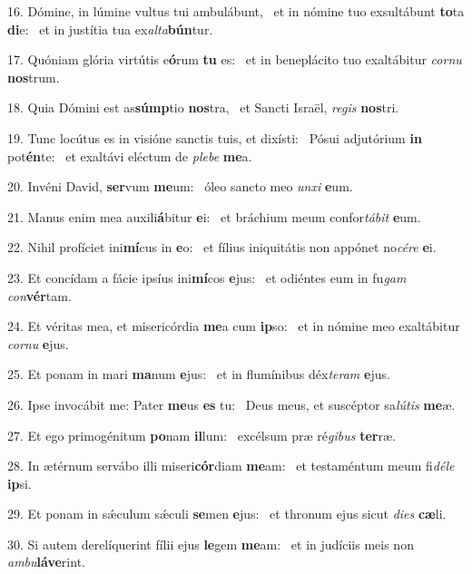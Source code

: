 16. Dómine, in lúmine vultus tui ambulábunt, \dag\  et in nómine tuo exsultábunt \textbf{to}ta \textbf{di}e: \ast\  et in justítia tua ex\textit{al}\textit{ta}\textbf{bún}tur.\

17. Quóniam glória virtútis e\textbf{ó}rum \textbf{tu} es: \ast\  et in beneplácito tuo exaltábitur \textit{cor}\textit{nu} \textbf{nos}trum.\

18. Quia Dómini est as\textbf{súmp}tio \textbf{nos}tra, \ast\  et Sancti Israël, \textit{re}\textit{gis} \textbf{nos}tri.\

19. Tunc locútus es in visióne sanctis tuis, et dixísti: \dag\  Pósui adjutórium \textbf{in} pot\textbf{én}te: \ast\  et exaltávi eléctum de \textit{ple}\textit{be} \textbf{me}a.\

20. Invéni David, \textbf{ser}vum \textbf{me}um: \ast\  óleo sancto meo \textit{un}\textit{xi} \textbf{e}um.\

21. Manus enim mea auxili\textbf{á}bitur \textbf{e}i: \ast\  et bráchium meum confor\textit{tá}\textit{bit} \textbf{e}um.\

22. Nihil profíciet ini\textbf{mí}cus in \textbf{e}o: \ast\  et fílius iniquitátis non appónet no\textit{cé}\textit{re} \textbf{e}i.\

23. Et concídam a fácie ipsíus ini\textbf{mí}cos \textbf{e}jus: \ast\  et odiéntes eum in fu\textit{gam} \textit{con}\textbf{vér}tam.\

24. Et véritas mea, et misericórdia \textbf{me}a cum \textbf{ip}so: \ast\  et in nómine meo exaltábitur \textit{cor}\textit{nu} \textbf{e}jus.\

25. Et ponam in mari \textbf{ma}num \textbf{e}jus: \ast\  et in flumínibus déx\textit{te}\textit{ram} \textbf{e}jus.\

26. Ipse invocábit me: Pater \textbf{me}us \textbf{es} tu: \ast\  Deus meus, et suscéptor sa\textit{lú}\textit{tis} \textbf{me}æ.\

27. Et ego primogénitum \textbf{po}nam \textbf{il}lum: \ast\  excélsum præ ré\textit{gi}\textit{bus} \textbf{ter}ræ.\

28. In ætérnum servábo illi miseri\textbf{cór}diam \textbf{me}am: \ast\  et testaméntum meum fi\textit{dé}\textit{le} \textbf{ip}si.\

29. Et ponam in sǽculum sǽculi \textbf{se}men \textbf{e}jus: \ast\  et thronum ejus sicut \textit{di}\textit{es} \textbf{cæ}li.\

30. Si autem derelíquerint fílii ejus \textbf{le}gem \textbf{me}am: \ast\  et in judíciis meis non \textit{am}\textit{bu}\textbf{lá}\textbf{ve}rint.\

